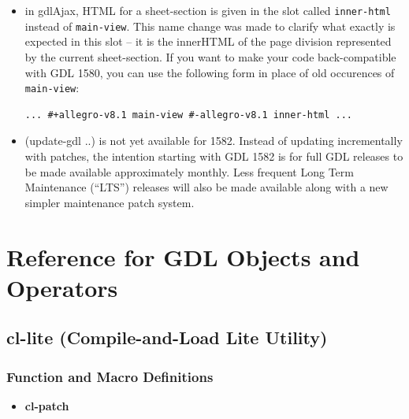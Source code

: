 \documentclass [11pt]{book}
\begin{document}
\begin{itemize}
\item in gdlAjax, HTML for a sheet-section is given in the slot called \texttt{inner-html} instead of \texttt{main-view}. This name change was made to clarify what exactly is
	 expected in this slot -- it is the innerHTML of the page
	 division represented by the current sheet-section. If you
	 want to make your code back-compatible with GDL 1580, you can
	 use the following form in place of old occurences of \texttt{main-view}: 

\begin{verbatim}... #+allegro-v8.1 main-view #-allegro-v8.1 inner-html ...
\end{verbatim}

\item (update-gdl ..) is not yet available for 1582. Instead
of updating incrementally with patches, the intention starting with
GDL 1582 is for full GDL releases to be made available approximately
monthly. Less frequent Long Term Maintenance (``LTS'') releases will
also be made available along with a new simpler maintenance patch
system.

\end{itemize}



\chapter{Reference for GDL Objects and Operators}

\label{chap:referenceforgdlobjectsandoperators}



\section{cl-lite (Compile-and-Load Lite Utility)}

\label{sec:cl-lite(compile-and-loadliteutility)}





\subsection{Function and Macro Definitions}

\label{subsec:functionandmacrodefinitions}



\begin{itemize}

\item {}
\label{prim:cl-patch}
\textbf{cl-patch}





\end{itemize}
\end{document}
